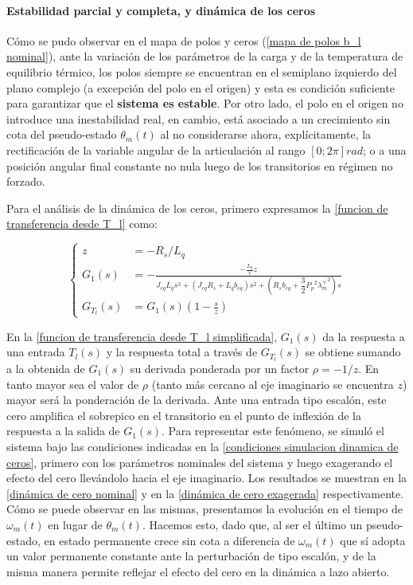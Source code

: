 \documentclass[a4paper, 10pt, onecolumn,journal]{ieeeconf}
\begin{document}
\paragraph{\textbf{Estabilidad parcial y completa, y dinámica de los ceros}}
Cómo se pudo observar en el mapa de polos y ceros (\cref{mapa de polos b_l nominal}),  ante la variación de los parámetros de la carga
y de la temperatura de equilibrio térmico, los polos siempre se encuentran
en el semiplano izquierdo del plano complejo (a excepción del polo en el origen) y esta es condición suficiente para
garantizar que el \textbf{sistema es estable}. Por otro lado, el polo en el origen no introduce una inestabilidad real, 
en cambio, está asociado a un crecimiento sin cota del pseudo-estado $\theta_m(t)$ al no considerarse ahora, explícitamente,
la rectificación de la variable angular de la articulación al rango  $[0;2\pi] rad$; o a una posición angular final constante no nula
luego de los transitorios en régimen no forzado.

Para el análisis de la dinámica de los ceros, primero %
expresamos la \cref{funcion de transferencia desde T_l}
como:

\begin{equation}
    \begin{cases}
        z &= -R_s/L_q\\
        G_1(s) &= -\frac{-\frac{L_q}{r}z}{J_{eq} L_{q} s^3 +\left( J_{eq} R_{s} + L_{q} b_{eq} \right)s^2 + \left( R_{s} b_{eq} + \dfrac{3}{2} {P_{p}}^2 { \lambda^{'r}_m}^2\right) s}\\
	    G_{T_l}(s) &= G_1(s)\left( 1 - \frac{s}{z}\right)
    \end{cases}
	\label{funcion de transferencia desde T_l simplificada}
\end{equation}

En la \cref{funcion de transferencia desde T_l simplificada}, $G_1(s)$ da la respuesta a una entrada $T_l(s)$
y la respuesta total a través de $G_{T_l}(s)$ se obtiene sumando a la obtenida de $G_1(s)$ su derivada
ponderada por un factor $\rho = -1/z$. En tanto mayor sea el valor de $\rho$ (tanto más cercano al eje imaginario se encuentra $z$)
mayor será la ponderación de la derivada. Ante una entrada tipo escalón,
este cero amplifica el sobrepico en el transitorio en el punto de inflexión de la respuesta a la salida de 
$G_1(s)$. Para representar este fenómeno, se simuló el sistema bajo las condiciones indicadas en la \cref{condiciones simulacion dinamica de ceros},
primero con los parámetros nominales del sistema y luego exagerando
el efecto del cero llevándolo hacia el eje imaginario. Los resultados se muestran en la \cref{dinámica de cero nominal} y en la \cref{dinámica de cero exagerada} respectivamente.
Cómo se puede observar en las mismas, presentamos la evolución en el tiempo de $\omega_m(t)$ en lugar de $\theta_m(t)$.
Hacemos esto, dado que, al ser el último un pseudo-estado, en estado permanente crece sin cota a diferencia de $\omega_m(t)$ que sí adopta un valor permanente constante ante la perturbación de tipo escalón, y de la misma
manera permite reflejar el efecto del cero en la dinámica a lazo abierto.
\end{document}

